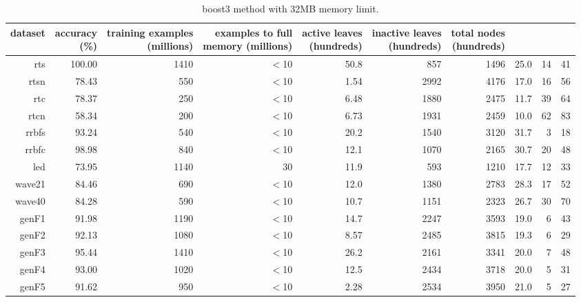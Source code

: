 \clearpage
\begin{table}
\caption{{\sc boost3} method with 32MB memory limit.}
\label{tab:boost3-32MB}
\centering
\begin{tabular}{|r|r|r|r|r|r|r|r|r|r|}
\hline
dataset	&
\rotatebox{90}{\parbox{9em}{accuracy\\(\%)}} &
\rotatebox{90}{\parbox{9em}{training examples\\(millions)}} &
\rotatebox{90}{\parbox{9em}{examples to full\\memory (millions)}} &
\rotatebox{90}{\parbox{9em}{active leaves\\(hundreds)}} &
\rotatebox{90}{\parbox{9em}{inactive leaves\\(hundreds)}} &
\rotatebox{90}{\parbox{9em}{total nodes\\(hundreds)}} &
\rotatebox{90}{\parbox{9em}{average tree depth}}	&
\rotatebox{90}{\parbox{9em}{training speed (\%)}} &
\rotatebox{90}{\parbox{9em}{prediction speed (\%)}} \\
\hline
{\sc rts} & 100.00 & 1410 & $<$10 & 50.8 & 857 & 1496 & 25.0 & 14 & 41 \\
{\sc rtsn} & 78.43 & 550 & $<$10 & 1.54 & 2992 & 4176 & 17.0 & 16 & 56 \\
{\sc rtc} & 78.37 & 250 & $<$10 & 6.48 & 1880 & 2475 & 11.7 & 39 & 64 \\
{\sc rtcn} & 58.34 & 200 & $<$10 & 6.73 & 1931 & 2459 & 10.0 & 62 & 83 \\
{\sc rrbfs} & 93.24 & 540 & $<$10 & 20.2 & 1540 & 3120 & 31.7 & 3 & 18 \\
{\sc rrbfc} & 98.98 & 840 & $<$10 & 12.1 & 1070 & 2165 & 30.7 & 20 & 48 \\
{\sc led} & 73.95 & 1140 & 30 & 11.9 & 593 & 1210 & 17.7 & 12 & 33 \\
{\sc wave21} & 84.46 & 690 & $<$10 & 12.0 & 1380 & 2783 & 28.3 & 17 & 52 \\
{\sc wave40} & 84.28 & 590 & $<$10 & 10.7 & 1151 & 2323 & 26.7 & 30 & 70 \\
{\sc genF1} & 91.98 & 1190 & $<$10 & 14.7 & 2247 & 3593 & 19.0 & 6 & 43 \\
{\sc genF2} & 92.13 & 1080 & $<$10 & 8.57 & 2485 & 3815 & 19.3 & 6 & 29 \\
{\sc genF3} & 95.44 & 1410 & $<$10 & 26.2 & 2161 & 3341 & 20.0 & 7 & 48 \\
{\sc genF4} & 93.00 & 1020 & $<$10 & 12.5 & 2434 & 3718 & 20.0 & 5 & 31 \\
{\sc genF5} & 91.62 & 950 & $<$10 & 2.28 & 2534 & 3950 & 21.0 & 5 & 27 \\

\end{tabular}
\end{table}
